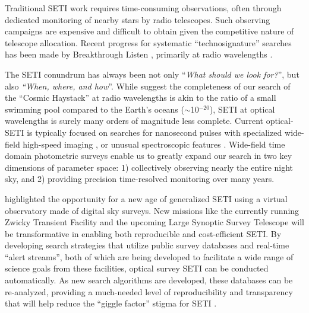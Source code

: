 \documentclass[twocolumn]{aastex62}
\begin{document}
Traditional SETI work requires time-consuming observations, often through dedicated monitoring of nearby stars by radio telescopes. Such observing campaigns are expensive and difficult to obtain given the competitive nature of telescope allocation. Recent progress for systematic ``technosignature'' searches has been made by Breakthrough Listen \citep{worden2017,isaacson2017}, primarily at radio wavelengths \citep[e.g.][]{price2018}. 


The SETI conundrum has always been not only ``{\it What should we look for?}'', but  also {\it ``When, where, and how}''. 
While \citet{wright2018c} suggest the completeness of our search of the ``Cosmic Haystack'' at radio wavelengths is akin to the ratio of a small swimming pool compared to the Earth's oceans ($\sim$10$^{-20}$), SETI at optical wavelengths is surely many orders of magnitude less complete.  
Current optical-SETI is typically focused on searches for nanosecond pulses with specialized wide-field high-speed imaging \citep{howard2004}, or unusual spectroscopic features \citep{isaacson2019}.
Wide-field time domain photometric surveys enable us to greatly expand our search in two key dimensions of parameter space: 1) collectively observing nearly the entire night sky, and 2) providing precision time-resolved monitoring over many years. 


\citet{djorgovski2000} highlighted the opportunity for a new age of generalized SETI using a virtual observatory made of digital sky surveys.
New missions like the currently running Zwicky Transient Facility \citep[ZTF;][]{bellm2014} and the upcoming Large Synoptic Survey Telescope \citep[LSST;][]{lsst} will be transformative in enabling both reproducible and cost-efficient SETI. By developing search strategies that utilize public survey databases and real-time ``alert streams'', both of which are being developed to facilitate a wide range of science goals from these facilities, optical survey SETI can be conducted automatically. As new search algorithms are developed, these databases can be re-analyzed, providing a much-needed level of reproducibility and transparency that will help reduce the ``giggle factor'' stigma for SETI \citep{wright2018b}.
\end{document}
